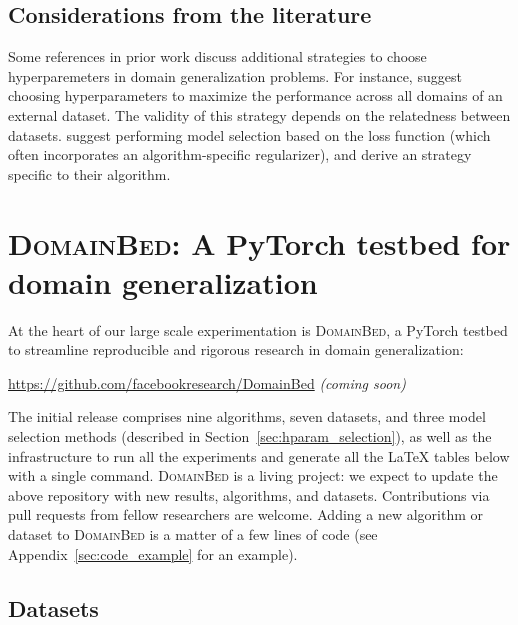 \documentclass{article}
\newcommand{\domainbed}{\textsc{DomainBed}\xspace}
\begin{document}
\subsection{Considerations from the literature}

Some references in prior work discuss additional strategies to choose hyperparemeters in domain generalization problems.
%
For instance, \citet[Appendix B.1]{krueger2020out} suggest choosing hyperparameters to maximize the performance across all domains of an external dataset.
%
The validity of this strategy depends on the relatedness between datasets.
%
\citet[Section 5.3.2]{albuquerque2019a} suggest performing model selection based on the loss function (which often incorporates an algorithm-specific regularizer), and \citet[Section 3]{d2018domain} derive an strategy specific to their algorithm.

\section{\domainbed: A PyTorch testbed for domain generalization}
\label{sec:benchmark}

At the heart of our large scale experimentation is \domainbed, a PyTorch \citep{paszke2019pytorch} testbed to streamline reproducible and rigorous research in domain generalization:
\begin{center}
    \url{https://github.com/facebookresearch/DomainBed} \textit{(coming soon)}
\end{center}

The initial release comprises nine algorithms, seven datasets, and three model selection methods (described in Section~\ref{sec:hparam_selection}), as well as the infrastructure to run all the experiments and generate all the \LaTeX{} tables below with a single command. 
%
\domainbed is a living project: we expect to update the above repository with new results, algorithms, and datasets. Contributions via pull requests from fellow researchers are welcome.
%
Adding a new algorithm or dataset to \domainbed is a matter of a few lines of code (see Appendix~\ref{sec:code_example} for an example).

\subsection{Datasets}
\label{sec:datasets}
\end{document}
